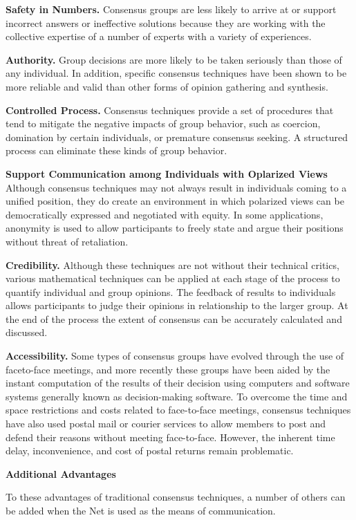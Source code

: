 \documentclass[a4]{article}
\begin{document}
\textbf{Safety in Numbers.} Consensus groups are less likely to arrive at or support incorrect answers or ineffective solutions because they are working with the collective expertise of a number of experts with a variety of experiences.

\textbf{Authority.} Group decisions are more likely to be taken seriously than those of any individual. In addition, specific consensus techniques have been shown to be more reliable and valid than other forms of opinion gathering and synthesis.

\textbf{Controlled Process.} Consensus techniques provide a set of procedures that tend to mitigate the negative impacts of group behavior, such as coercion, domination by certain individuals, or premature consensus seeking. A structured process can eliminate these kinds of group behavior.

\textbf{Support Communication among Individuals with Oplarized Views} Although consensus techniques may not always result in individuals coming to a unified position, they do create an environment in which polarized views can be democratically expressed and negotiated with equity. In some applications, anonymity is used to allow participants to freely state and argue their positions without threat of retaliation.

\textbf{Credibility.} Although these techniques are not without their technical critics, various mathematical techniques can be applied at each stage of the process to quantify individual and group opinions. The feedback of results to individuals allows participants to judge their opinions in relationship to the larger group. At the end of the process the extent of consensus can be accurately calculated and discussed.

\textbf{Accessibility.} Some types of consensus groups have evolved through the use of faceto-face meetings, and more recently these groups have been aided by the instant computation of the results of their decision using computers and software systems generally known as decision-making software. To overcome the time and space restrictions and costs related to face-to-face meetings, consensus techniques have also used postal mail or courier services to allow members to post and defend their reasons without meeting face-to-face. However, the inherent time delay, inconvenience, and cost of postal returns remain problematic.


\vspace{0.5cm}
{\large\textbf{Additional Advantages}}
\vspace{0.5cm}

To these advantages of traditional consensus techniques, a number of others can be added when the Net is used as the means of communication.
\end{document}
